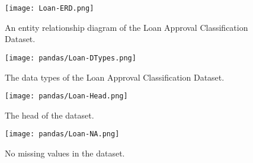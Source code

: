 \begin{figure}[H]
    \centering
    \texttt{[image: Loan-ERD.png]}
    \caption{An entity relationship diagram of the Loan Approval Classification Dataset.}
    \label{fig:Loan-ERD}
\end{figure}

\begin{figure}[H]
    \centering
    \texttt{[image: pandas/Loan-DTypes.png]}
    \caption{The data types of the Loan Approval Classification Dataset.}
    \label{fig:Loan-DTypes}
\end{figure}

\begin{figure}[H]
    \centering
    \texttt{[image: pandas/Loan-Head.png]}
    \caption{The head of the dataset.}
    \label{fig:Loan-Head}
\end{figure}

\begin{figure}[H]
    \centering
    \texttt{[image: pandas/Loan-NA.png]}
    \caption{No missing values in the dataset.}
    \label{fig:Loan-NAs}
\end{figure}


